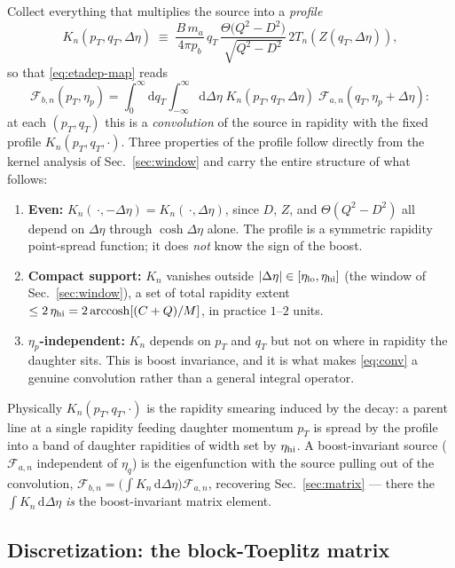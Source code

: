 \documentclass[11pt]{article}
\newcommand{\Fan}{\mathcal{F}_{a,n}}
\newcommand{\Fbn}{\mathcal{F}_{b,n}}
\begin{document}
Collect everything that multiplies the source into a \emph{profile}
\begin{equation}
K_n(p_T,q_T,\Delta\eta)
\;\equiv\;
\frac{B\,m_a}{4\pi p_b}\,q_T\,
\frac{\Theta\!\big(Q^2-D^2\big)}{\sqrt{Q^2-D^2}}\,
2T_n(Z(q_T,\Delta\eta)),
\label{eq:profile}
\end{equation}
so that \eqref{eq:etadep-map} reads
\begin{equation}
\Fbn(p_T,\eta_p)=\int_0^\infty\!\mathrm{d}q_T
\int_{-\infty}^{\infty}\!\mathrm{d}\Delta\eta\;
K_n(p_T,q_T,\Delta\eta)\;\Fan(q_T,\eta_p+\Delta\eta):
\label{eq:conv}
\end{equation}
at each $(p_T,q_T)$ this is a \emph{convolution} of the source in rapidity
with the fixed profile $K_n(p_T,q_T,\cdot)$.  Three properties of the
profile follow directly from the kernel analysis of Sec.~\ref{sec:window}
and carry the entire structure of what follows:
\begin{enumerate}
\item \textbf{Even:} $K_n(\,\cdot,-\Delta\eta)=K_n(\,\cdot,\Delta\eta)$,
since $D$, $Z$, and $\Theta(Q^2-D^2)$ all depend on $\Delta\eta$ through
$\cosh\Delta\eta$ alone.  The profile is a symmetric rapidity
point-spread function; it does \emph{not} know the sign of the boost.
\item \textbf{Compact support:} $K_n$ vanishes outside
$|\Delta\eta|\in[\eta_{\rm lo},\eta_{\rm hi}]$ (the window of
Sec.~\ref{sec:window}), a set of total rapidity extent
$\le2\,\eta_{\rm hi}=2\operatorname{arccosh}[(C+Q)/M]$, in practice
$1$--$2$ units.
\item \textbf{$\eta_p$-independent:} $K_n$ depends on $p_T$ and $q_T$ but
not on where in rapidity the daughter sits.  This is boost invariance, and
it is what makes \eqref{eq:conv} a genuine convolution rather than a
general integral operator.
\end{enumerate}
Physically $K_n(p_T,q_T,\cdot)$ is the rapidity smearing induced by the
decay: a parent line at a single rapidity feeding daughter momentum
$p_T$ is spread by the profile into a band of daughter rapidities of
width set by $\eta_{\rm hi}$.  A boost-invariant source ($\Fan$
independent of $\eta_q$) is the eigenfunction with the source pulling out
of the convolution, $\Fbn=\big(\int K_n\,\mathrm{d}\Delta\eta\big)\Fan$,
recovering Sec.~\ref{sec:matrix} --- there the $\int K_n\,\mathrm{d}\Delta\eta$
\emph{is} the boost-invariant matrix element.

\subsection{Discretization: the block-Toeplitz matrix}
\label{sec:blocktoeplitz}
\end{document}
